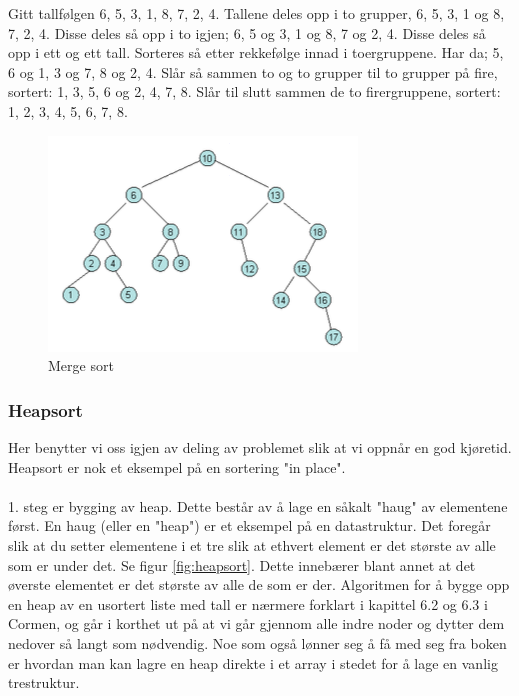 \begin{boxed}
Gitt tallfølgen 6, 5, 3, 1, 8, 7, 2, 4. Tallene deles opp i to grupper, 6, 5, 3, 1 og 8, 7, 2, 4. Disse deles så opp i to igjen; 6, 5 og 3, 1 og 8, 7 og 2, 4. Disse deles så opp i ett og ett tall. Sorteres så etter rekkefølge innad i toergruppene. Har da; 5, 6 og 1, 3 og 7, 8 og 2, 4. Slår så sammen to og to grupper til to grupper på fire, sortert: 1, 3, 5, 6 og 2, 4, 7, 8. Slår til slutt sammen de to firergruppene, sortert: 1, 2, 3, 4, 5, 6, 7, 8.

\begin{figure}[H]
\includegraphics[scale=0.7]{images/mergesort}
\centering %
\caption{Merge sort}
\label{fig:mergesort}
\end{figure}
\end{boxed}

\subsubsection{Heapsort}
Her benytter vi oss igjen av deling av problemet slik at vi oppnår en god kjøretid. Heapsort er nok et eksempel på en sortering "in place".
\\\\
1. steg er bygging av heap. Dette består av å lage en såkalt "haug" av elementene først. En haug (eller en "heap") er et eksempel på en datastruktur. Det foregår slik at du setter elementene i et tre slik at ethvert element er det største av alle som er under det. Se figur \ref{fig:heapsort}. Dette innebærer blant annet at det øverste elementet er det største av alle de som er der. Algoritmen for å bygge opp en heap av en usortert liste med tall er nærmere forklart i kapittel 6.2 og 6.3 i Cormen, og går i korthet ut på at vi går gjennom alle indre noder og dytter dem nedover så langt som nødvendig. Noe som også lønner seg å få med seg fra boken er hvordan man kan lagre en heap direkte i et array i stedet for å lage en vanlig trestruktur.

